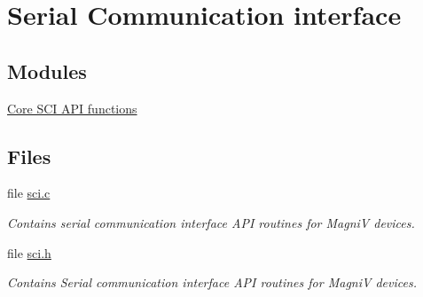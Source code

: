 \hypertarget{group___s_c_i}{}\section{Serial Communication interface}
\label{group___s_c_i}
\subsection*{Modules}
\begin{DoxyCompactItemize}
\item 
\hyperlink{group___core_s_c_i}{Core S\+C\+I A\+P\+I functions}
\end{DoxyCompactItemize}
\subsection*{Files}
\begin{DoxyCompactItemize}
\item 
file \hyperlink{sci_8c}{sci.\+c}
\begin{DoxyCompactList}\small\item\em Contains serial communication interface A\+P\+I routines for Magni\+V devices. \end{DoxyCompactList}\item 
file \hyperlink{sci_8h}{sci.\+h}
\begin{DoxyCompactList}\small\item\em Contains Serial communication interface A\+P\+I routines for Magni\+V devices. \end{DoxyCompactList}\end{DoxyCompactItemize}
